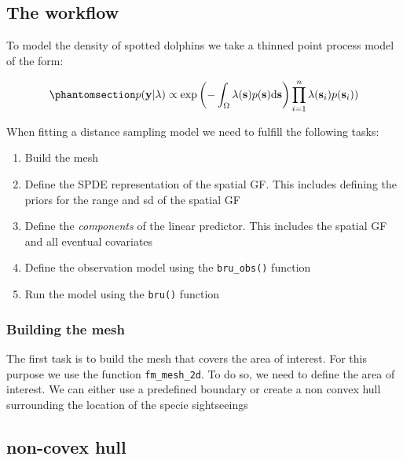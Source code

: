 \documentclass[
  letterpaper,
  DIV=11,
  numbers=noendperiod]{scrartcl}
\begin{document}
\subsection{The workflow}\label{the-workflow}

To model the density of spotted dolphins we take a thinned point process
model of the form:

\begin{equation}\phantomsection\label{eq-thinned_pp}{
p(\mathbf{y} | \lambda)  \propto \exp \left( -\int_\Omega \lambda(\mathbf{s}) p(\mathbf{s}) \mathrm{d}\mathbf{s} \right) \prod_{i=1}^n \lambda(\mathbf{s}_i) p(\mathbf{s}_i)) 
}\end{equation}

When fitting a distance sampling model we need to fulfill the following
tasks:

\begin{enumerate}
\def\labelenumi{\arabic{enumi}.}
\item
  Build the mesh
\item
  Define the SPDE representation of the spatial GF. This includes
  defining the priors for the range and sd of the spatial GF
\item
  Define the \emph{components} of the linear predictor. This includes
  the spatial GF and all eventual covariates
\item
  Define the observation model using the \texttt{bru\_obs()} function
\item
  Run the model using the \texttt{bru()} function
\end{enumerate}

\subsubsection{Building the mesh}\label{building-the-mesh}

The first task is to build the mesh that covers the area of interest.
For this purpose we use the function \texttt{fm\_mesh\_2d}. To do so, we
need to define the area of interest. We can either use a predefined
boundary or create a non convex hull surrounding the location of the
specie sightseeings

\subsection{non-covex hull}
\end{document}
